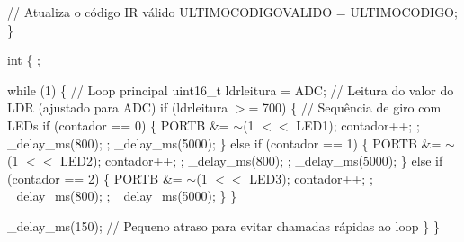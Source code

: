 // Atualiza o código IR válido ULTIMOCODIGOVALIDO = ULTIMOCODIGO; \}

int  \{ ;

while (1) \{ // Loop principal uint16\+\_\+t ldrleitura = ADC; // Leitura do valor do LDR (ajustado para ADC) if (ldrleitura \texorpdfstring{$>$}{>}= 700) \{ // Sequência de giro com LEDs if (contador == 0) \{ PORTB \&= \texorpdfstring{$\sim$}{\string~}(1 \texorpdfstring{$<$}{<}\texorpdfstring{$<$}{<} LED1); contador++; ; \+\_\+delay\+\_\+ms(800); ; \+\_\+delay\+\_\+ms(5000); \} else if (contador == 1) \{ PORTB \&= \texorpdfstring{$\sim$}{\string~}(1 \texorpdfstring{$<$}{<}\texorpdfstring{$<$}{<} LED2); contador++; ; \+\_\+delay\+\_\+ms(800); ; \+\_\+delay\+\_\+ms(5000); \} else if (contador == 2) \{ PORTB \&= \texorpdfstring{$\sim$}{\string~}(1 \texorpdfstring{$<$}{<}\texorpdfstring{$<$}{<} LED3); contador++; ; \+\_\+delay\+\_\+ms(800); ; \+\_\+delay\+\_\+ms(5000); \} \}

\+\_\+delay\+\_\+ms(150); // Pequeno atraso para evitar chamadas rápidas ao loop \} \} 